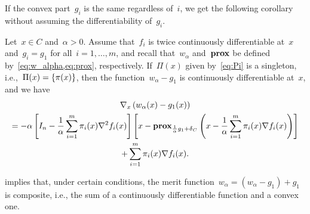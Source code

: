 \documentclass[../../main]{subfiles}
\begin{document}
                        If the convex part~$g_i$ is the same regardless of~$i$, we get the following corollary without assuming the differentiability of~$g_i$.
                        \begin{corollary} \label{thm:w_alpha composite}
                            Let~$x \in C$ and~$\alpha > 0$.
                            Assume that~$f_i$ is twice continuously differentiable at~$x$ and~$g_i = g_1$ for all~$i = 1, \dots, m$, and recall that~$w_\alpha$ and~$\prox$ be defined by~\cref{eq:w_alpha,eq:prox}, respectively.
                            If~$\Pi(x)$ given by~\cref{eq:Pi} is a singleton, i.e.,~$\Pi(x) = \set*{\pi(x)}$, then the function~$w_\alpha - g_1$ is continuously differentiable at~$x$, and we have
                            \begin{multline}
                                \nabla_x \left( w_\alpha(x) - g_1(x) \right) \\
                                = - \alpha \left[ I_n - \frac{1}{\alpha} \sum_{i = 1}^{m} \pi_i(x) \nabla^2 f_i(x) \right] \left[x - \prox_{\frac{1}{\alpha} g_1 + \indicator_C} \left( x - \frac{1}{\alpha} \sum_{i = 1}^{m} \pi_i(x) \nabla f_i(x) \right) \right] \\
                                + \sum_{i = 1}^{m} \pi_i(x) \nabla f_i(x)
                            .\end{multline}
                        \end{corollary}
                         implies that, under certain conditions, the merit function~$w_\alpha = (w_\alpha - g_1) + g_1$ is composite, i.e., the sum of a continuously differentiable function and a convex one.
\end{document}
